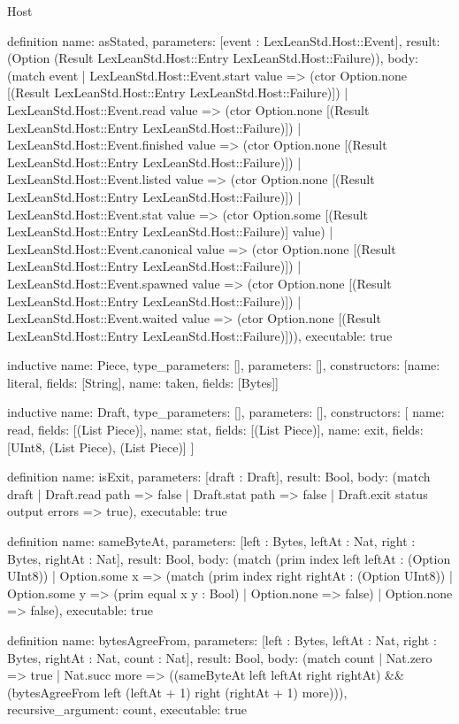 \begin{lexlean}{Host}
\begin{semanticmodule}
definition{
  name: asStated,
  parameters: [event : LexLeanStd.Host::Event],
  result: (Option (Result LexLeanStd.Host::Entry LexLeanStd.Host::Failure)),
  body: (match event
    | LexLeanStd.Host::Event.start value => (ctor Option.none [(Result LexLeanStd.Host::Entry LexLeanStd.Host::Failure)])
    | LexLeanStd.Host::Event.read value => (ctor Option.none [(Result LexLeanStd.Host::Entry LexLeanStd.Host::Failure)])
    | LexLeanStd.Host::Event.finished value => (ctor Option.none [(Result LexLeanStd.Host::Entry LexLeanStd.Host::Failure)])
    | LexLeanStd.Host::Event.listed value => (ctor Option.none [(Result LexLeanStd.Host::Entry LexLeanStd.Host::Failure)])
    | LexLeanStd.Host::Event.stat value => (ctor Option.some [(Result LexLeanStd.Host::Entry LexLeanStd.Host::Failure)] value)
    | LexLeanStd.Host::Event.canonical value => (ctor Option.none [(Result LexLeanStd.Host::Entry LexLeanStd.Host::Failure)])
    | LexLeanStd.Host::Event.spawned value => (ctor Option.none [(Result LexLeanStd.Host::Entry LexLeanStd.Host::Failure)])
    | LexLeanStd.Host::Event.waited value => (ctor Option.none [(Result LexLeanStd.Host::Entry LexLeanStd.Host::Failure)])),
  executable: true
}

inductive{
  name: Piece,
  type_parameters: [],
  parameters: [],
  constructors: [{name: literal, fields: [String]}, {name: taken, fields: [Bytes]}]
}

inductive{
  name: Draft,
  type_parameters: [],
  parameters: [],
  constructors: [
    {name: read, fields: [(List Piece)]},
    {name: stat, fields: [(List Piece)]},
    {name: exit, fields: [UInt8, (List Piece), (List Piece)]}
  ]
}

definition{
  name: isExit,
  parameters: [draft : Draft],
  result: Bool,
  body: (match draft
    | Draft.read path => false
    | Draft.stat path => false
    | Draft.exit status output errors => true),
  executable: true
}

definition{
  name: sameByteAt,
  parameters: [left : Bytes, leftAt : Nat, right : Bytes, rightAt : Nat],
  result: Bool,
  body: (match (prim index left leftAt : (Option UInt8))
    | Option.some x => (match (prim index right rightAt : (Option UInt8))
      | Option.some y => (prim equal x y : Bool)
      | Option.none => false)
    | Option.none => false),
  executable: true
}

definition{
  name: bytesAgreeFrom,
  parameters: [left : Bytes, leftAt : Nat, right : Bytes, rightAt : Nat, count : Nat],
  result: Bool,
  body: (match count
    | Nat.zero => true
    | Nat.succ more => ((sameByteAt left leftAt right rightAt) && (bytesAgreeFrom left (leftAt + 1) right (rightAt + 1) more))),
  recursive_argument: count,
  executable: true
}


\end{semanticmodule}
\end{lexlean}
